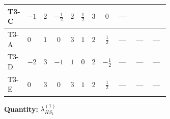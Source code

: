 \documentclass[8pt]{article}
\begin{document}
\begin{landscape}
\begin{longtable}{@{}llcccccc >{\raggedright\arraybackslash}p{0.21\linewidth} >{\raggedright\arraybackslash}p{0.21\linewidth} >{\raggedright\arraybackslash}p{0.21\linewidth}@{}}
\midrule
T3-C & $-1$ & $2$ & $-\frac{1}{2}$ & $2$ & $\frac{1}{2}$ & $3$ & $0$ & --- & \scriptsize\adjustbox{max width=\linewidth}{$\begin{gathered} +{\lambda_{H H^\dagger S_1^\dagger S_2^\dagger}^{\rm Cross}} \left(\frac{3}{4} \operatorname{Tr}\!\left({y_1}\,\left({y_2}\right)^{\dagger}\right)+4 \left({\lambda_{H H^\dagger S_1^\dagger S_2^\dagger}^{\rm Cross}}\right)^{*}+3 \left({\lambda_{11}}\right)^{*}\right)\end{gathered}$} & \scriptsize\adjustbox{max width=\linewidth}{$\begin{gathered} +\frac{3}{4} \left({\lambda_{H H^\dagger S_1^\dagger S_2^\dagger}^{\rm Cross}}\right)^{*} \operatorname{Tr}\!\left({y_2}\,\left({y_1}\right)^{\dagger}\right)\end{gathered}$} \\
\midrule
T3-A & $0$ & $1$ & $0$ & $3$ & $1$ & $2$ & $\frac{1}{2}$ & --- & --- & --- \\
\midrule
T3-D & $-2$ & $3$ & $-1$ & $1$ & $0$ & $2$ & $-\frac{1}{2}$ & --- & --- & --- \\
\midrule
T3-E & $0$ & $3$ & $0$ & $3$ & $1$ & $2$ & $\frac{1}{2}$ & --- & --- & --- \\
\midrule
\bottomrule
\end{longtable}
\clearpage
\noindent\textbf{Quantity: }$\lambda_{HS_1}^{(1)}$\par\smallskip

\end{landscape}
\end{document}

